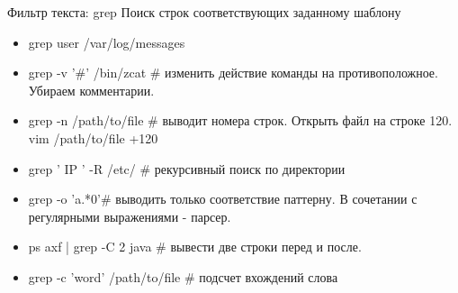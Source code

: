 \begin{frame}[fragile]{Фильтр текста: grep}
Поиск строк соответствующих заданному шаблону

\begin{itemize}
    \item grep \alert{user} /var/log/messages 
    \item grep \alert{-v} '\#' /bin/zcat \# изменить действие команды на противоположное. Убираем комментарии.

    \item grep \alert{-n} /path/to/file \# выводит номера строк. Открыть файл на строке 120. vim /path/to/file +120

    \item grep ' IP ' \alert{-R} /etc/ \# рекурсивный поиск по директории

    \item grep \alert{-o} 'a.*0'\# выводить только соответствие паттерну. В сочетании с регулярными выражениями - парсер.

    \item ps axf | grep \alert{-C 2} java \# вывести две строки перед и после.

    \item grep \alert{-c} 'word' /path/to/file \# подсчет вхождений слова
\end{itemize}
    
\end{frame}
